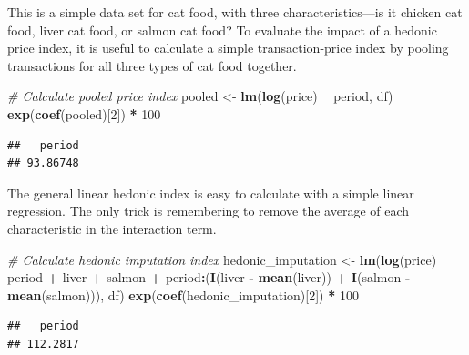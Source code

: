 \documentclass[]{article}
\newenvironment{Shaded}{\begin{snugshade}}{\end{snugshade}}
\newcommand{\CommentTok}[1]{\textcolor[rgb]{0.56,0.35,0.01}{\textit{#1}}}
\newcommand{\DecValTok}[1]{\textcolor[rgb]{0.00,0.00,0.81}{#1}}
\newcommand{\KeywordTok}[1]{\textcolor[rgb]{0.13,0.29,0.53}{\textbf{#1}}}
\newcommand{\NormalTok}[1]{#1}
\newcommand{\OperatorTok}[1]{\textcolor[rgb]{0.81,0.36,0.00}{\textbf{#1}}}
\newcommand{\StringTok}[1]{\textcolor[rgb]{0.31,0.60,0.02}{#1}}
\begin{document}
This is a simple data set for cat food, with three characteristics---is it chicken cat food, liver cat food, or salmon cat food? To evaluate the impact of a hedonic price index, it is useful to calculate a simple transaction-price index by pooling transactions for all three types of cat food together.

\begin{Shaded}
\begin{Highlighting}[]
\CommentTok{# Calculate pooled price index}
\NormalTok{pooled <-}\StringTok{ }\KeywordTok{lm}\NormalTok{(}\KeywordTok{log}\NormalTok{(price) }\OperatorTok{~}\StringTok{ }\NormalTok{period, df)}
\KeywordTok{exp}\NormalTok{(}\KeywordTok{coef}\NormalTok{(pooled)[}\DecValTok{2}\NormalTok{]) }\OperatorTok{*}\StringTok{ }\DecValTok{100}
\end{Highlighting}
\end{Shaded}

\begin{verbatim}
##   period 
## 93.86748
\end{verbatim}

The general linear hedonic index is easy to calculate with a simple linear regression. The only trick is remembering to remove the average of each characteristic in the interaction term.

\begin{Shaded}
\begin{Highlighting}[]
\CommentTok{# Calculate hedonic imputation index}
\NormalTok{hedonic_imputation <-}\StringTok{ }\KeywordTok{lm}\NormalTok{(}\KeywordTok{log}\NormalTok{(price) }\OperatorTok{~}\StringTok{ }\NormalTok{period }\OperatorTok{+}\StringTok{ }\NormalTok{liver }\OperatorTok{+}\StringTok{ }\NormalTok{salmon }\OperatorTok{+}\StringTok{ }
\StringTok{                           }\NormalTok{period}\OperatorTok{:}\NormalTok{(}\KeywordTok{I}\NormalTok{(liver }\OperatorTok{-}\StringTok{ }\KeywordTok{mean}\NormalTok{(liver)) }\OperatorTok{+}\StringTok{ }\KeywordTok{I}\NormalTok{(salmon }\OperatorTok{-}\StringTok{ }\KeywordTok{mean}\NormalTok{(salmon))), }
\NormalTok{                         df)}
\KeywordTok{exp}\NormalTok{(}\KeywordTok{coef}\NormalTok{(hedonic_imputation)[}\DecValTok{2}\NormalTok{]) }\OperatorTok{*}\StringTok{ }\DecValTok{100}
\end{Highlighting}
\end{Shaded}

\begin{verbatim}
##   period 
## 112.2817
\end{verbatim}
\end{document}
